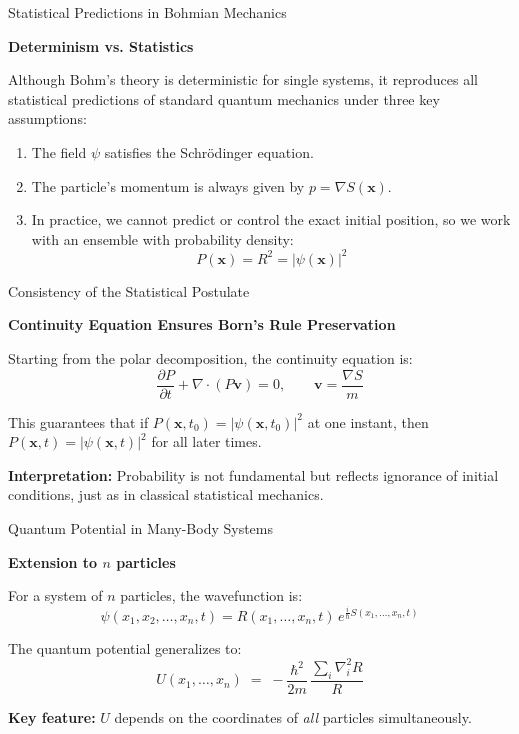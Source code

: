 \begin{frame}{Statistical Predictions in Bohmian Mechanics}

  \textbf{Determinism vs. Statistics}


  Although Bohm’s theory is deterministic for single systems,
  it reproduces all statistical predictions of standard quantum mechanics
  under three key assumptions:

  \pause
  \begin{enumerate}
    \item The field $\psi$ satisfies the Schrödinger equation.
    \pause
    \item The particle’s momentum is always given by $p = \nabla S(\mathbf{x})$.
    \pause
    \item In practice, we cannot predict or control the exact initial position,
          so we work with an ensemble with probability density:
          \[
            P(\mathbf{x}) = R^2 = |\psi(\mathbf{x})|^2
          \]
  \end{enumerate}

\end{frame}

\begin{frame}{Consistency of the Statistical Postulate}

  \textbf{Continuity Equation Ensures Born’s Rule Preservation}

  \pause
  Starting from the polar decomposition, the continuity equation is:
  \[
    \frac{\partial P}{\partial t} + \nabla \cdot (P \mathbf{v}) = 0,
    \qquad \mathbf{v} = \frac{\nabla S}{m}
  \]

  \pause
  This guarantees that if $P(\mathbf{x},t_0) = |\psi(\mathbf{x},t_0)|^2$
  at one instant, then $P(\mathbf{x},t) = |\psi(\mathbf{x},t)|^2$
  for all later times.

  \pause
  \textbf{Interpretation:}
  Probability is not fundamental but reflects ignorance of initial conditions,
  just as in classical statistical mechanics.

\end{frame}


\begin{frame}{Quantum Potential in Many-Body Systems}

\textbf{Extension to $n$ particles}

\pause
For a system of $n$ particles, the wavefunction is:
\[
\psi(x_1, x_2, \dots, x_n, t) = R(x_1, \dots, x_n,t)\, e^{\tfrac{i}{\hbar} S(x_1, \dots, x_n,t)}
\]

\pause
The quantum potential generalizes to:
\[
U(x_1, \dots, x_n) \;=\; -\frac{\hbar^2}{2m} \, \frac{\sum_i \nabla_i^2 R}{R}
\]

\pause
\textbf{Key feature:} $U$ depends on the coordinates of \emph{all} particles simultaneously.

\end{frame}

